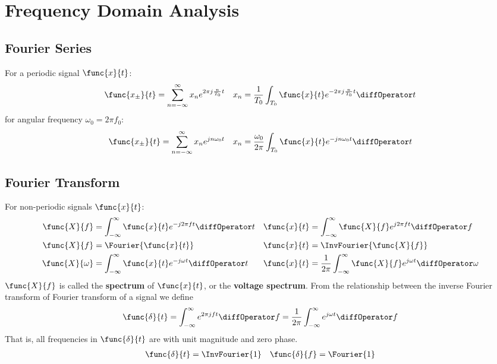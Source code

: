 \chapter{Frequency Domain Analysis}
\section{Fourier Series}
For a periodic signal \(\func{x}{t}\):
\begin{align*}
    \func{x_{\pm}}{t} = \sum_{n = -\infty}^{\infty} x_n e^{2\pi j \frac{n}{T_0} t} & & x_n = \dfrac{1}{T_0} \int_{T_0} \func{x}{t} e^{-2 \pi j \frac{n}{T_0} t} \diffOperator t
\end{align*}
for angular frequency \(\omega_0 = 2\pi f_0\):
\begin{align*}
    \func{x_{\pm}}{t} = \sum_{n = -\infty}^{\infty} x_n e^{ j n \omega_0 t} & & x_n = \dfrac{\omega_0}{2\pi} \int_{T_0} \func{x}{t} e^{- j n \omega_0 t} \diffOperator t
\end{align*}
\section{Fourier Transform}
For non-periodic signals \(\func{x}{t}\):
\begin{align*}
    \func{X}{f} &= \int_{-\infty}^{\infty} \func{x}{t} e^{-j 2\pi f t} \diffOperator t &  \func{x}{t} &= \int_{-\infty}^{\infty} \func{X}{f} e^{j 2\pi f t}\diffOperator f\\
    \func{X}{f} &= \Fourier{\func{x}{t}}  & \func{x}{t} &= \InvFourier{\func{X}{f}}\\
    \func{X}{\omega} &= \int_{-\infty}^{\infty} \func{x}{t} e^{-j \omega t} \diffOperator t & \func{x}{t} &= \dfrac{1}{2\pi} \int_{-\infty}^{\infty} \func{X}{f} e^{j \omega t}\diffOperator \omega
\end{align*}
\(\func{X}{f}\) is called the \textbf{spectrum} of \(\func{x}{t}\), or the \textbf{voltage spectrum}. From the relationship between the inverse Fourier transform of Fourier transform of a signal we define
\begin{equation*}
    \func{\delta}{t} = \int_{-\infty}^{\infty} e^{2\pi j f t}\diffOperator f = \dfrac{1}{2\pi} \int_{-\infty}^{\infty} e^{j \omega t}\diffOperator f
\end{equation*}
That is, all frequencies in \(\func{\delta}{t}\) are with unit magnitude and zero phase.
\begin{align*}
    \func{\delta}{t} = \InvFourier{1} & & \func{\delta}{f} = \Fourier{1}
\end{align*}

